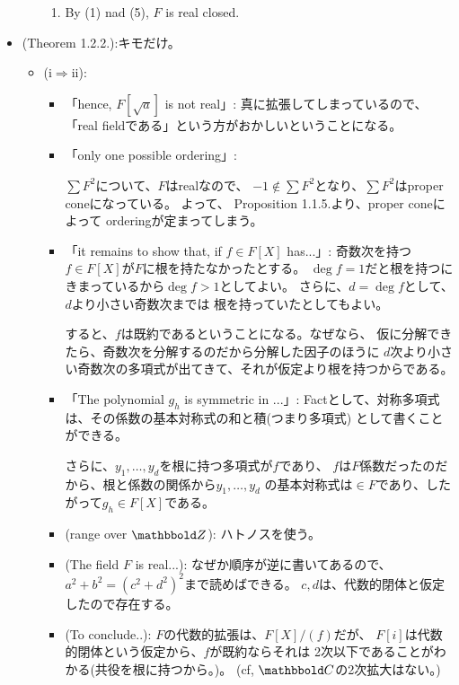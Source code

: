 \documentclass[9pt]{ltjsarticle}
\begin{document}
\begin{itemize}
\begin{itemize}
\begin{enumerate}
      \item
      By (1) nad (5), $F$ is real closed.
    \end{enumerate}
  \end{itemize}
  \item
  (Theorem 1.2.2.):キモだけ。
  \begin{itemize}
    \item (i$\Rightarrow$ii):
    \begin{itemize}
      \item 「hence, $F[\sqrt{a}]$ is not real」:
      真に拡張してしまっているので、「real fieldである」という方がおかしいということになる。
      \item 「only one possible ordering」:

      $\sum F^2$について、$F$はrealなので、
      $-1 \notin \sum F^2$となり、$\sum F^2$はproper coneになっている。
      よって、      Proposition 1.1.5.より、proper coneによって
      orderingが定まってしまう。
      \item
      「it remains to show that, if $f\in F[X]$ has...」:
      奇数次を持つ$f\in F[X]$が$F$に根を持たなかったとする。
      $\deg f=1$だと根を持つにきまっているから$\deg f >1$としてよい。
      さらに、$d=\deg f$として、$d$より小さい奇数次までは
      根を持っていたとしてもよい。

      すると、$f$は既約であるということになる。なぜなら、
      仮に分解できたら、奇数次を分解するのだから分解した因子のほうに
      $d$次より小さい奇数次の多項式が出てきて、それが仮定より根を持つからである。

      \item
      「The polynomial $g_h$ is symmetric in ...」:
      Factとして、対称多項式は、その係数の基本対称式の和と積(つまり多項式)
      として書くことができる。

      さらに、$y_1,\dots,y_d$を根に持つ多項式が$f$であり、
      $f$は$F$係数だったのだから、根と係数の関係から$y_1,\dots,y_d$
      の基本対称式は$\in F$であり、したがって$g_h\in F[X]$である。

      \item (range over $\Z$):
      ハトノスを使う。

      \item (The field $F$ is real...):
      なぜか順序が逆に書いてあるので、$a^2+b^2=(c^2+d^2)^2$まで読めばできる。
      $c,d$は、代数的閉体と仮定したので存在する。

      \item
      (To conclude..):
      $F$の代数的拡張は、$F[X]/(f)$だが、
      $F[i]$は代数的閉体という仮定から、$f$が既約ならそれは
      2次以下であることがわかる(共役を根に持つから。)。
      (cf, $\C$の2次拡大はない。)



\end{itemize}
\end{itemize}
\end{itemize}
\end{document}
